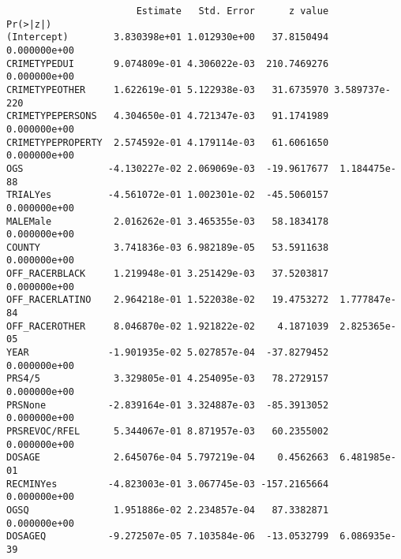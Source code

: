 \documentclass[
  letterpaper,
  DIV=11,
  numbers=noendperiod]{scrartcl}
\newenvironment{Shaded}{\begin{snugshade}}{\end{snugshade}}
\newcommand{\FunctionTok}[1]{\textcolor[rgb]{0.28,0.35,0.67}{#1}}
\newcommand{\NormalTok}[1]{\textcolor[rgb]{0.00,0.23,0.31}{#1}}
\newcommand{\SpecialCharTok}[1]{\textcolor[rgb]{0.37,0.37,0.37}{#1}}
\begin{document}
\begin{verbatim}
                       Estimate   Std. Error      z value      Pr(>|z|)
(Intercept)        3.830398e+01 1.012930e+00   37.8150494  0.000000e+00
CRIMETYPEDUI       9.074809e-01 4.306022e-03  210.7469276  0.000000e+00
CRIMETYPEOTHER     1.622619e-01 5.122938e-03   31.6735970 3.589737e-220
CRIMETYPEPERSONS   4.304650e-01 4.721347e-03   91.1741989  0.000000e+00
CRIMETYPEPROPERTY  2.574592e-01 4.179114e-03   61.6061650  0.000000e+00
OGS               -4.130227e-02 2.069069e-03  -19.9617677  1.184475e-88
TRIALYes          -4.561072e-01 1.002301e-02  -45.5060157  0.000000e+00
MALEMale           2.016262e-01 3.465355e-03   58.1834178  0.000000e+00
COUNTY             3.741836e-03 6.982189e-05   53.5911638  0.000000e+00
OFF_RACERBLACK     1.219948e-01 3.251429e-03   37.5203817  0.000000e+00
OFF_RACERLATINO    2.964218e-01 1.522038e-02   19.4753272  1.777847e-84
OFF_RACEROTHER     8.046870e-02 1.921822e-02    4.1871039  2.825365e-05
YEAR              -1.901935e-02 5.027857e-04  -37.8279452  0.000000e+00
PRS4/5             3.329805e-01 4.254095e-03   78.2729157  0.000000e+00
PRSNone           -2.839164e-01 3.324887e-03  -85.3913052  0.000000e+00
PRSREVOC/RFEL      5.344067e-01 8.871957e-03   60.2355002  0.000000e+00
DOSAGE             2.645076e-04 5.797219e-04    0.4562663  6.481985e-01
RECMINYes         -4.823003e-01 3.067745e-03 -157.2165664  0.000000e+00
OGSQ               1.951886e-02 2.234857e-04   87.3382871  0.000000e+00
DOSAGEQ           -9.272507e-05 7.103584e-06  -13.0532799  6.086935e-39
\end{verbatim}

\begin{Shaded}
\end{Shaded}
\end{document}
